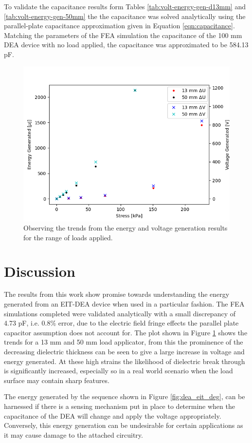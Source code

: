 To validate the capacitance results form Tables \ref{tab:volt-energy-gen-d13mm} and \ref{tab:volt-energy-gen-50mm} the the capacitance was solved analytically using the parallel-plate capacitance approximation given in Equation \ref{eqn:capacitance}. Matching the parameters of the FEA simulation the capacitance of the 100 mm DEA device with no load applied, the capacitance was approximated to be 584.13 pF.

\begin{figure}[H]
	\centering
	\includegraphics[width=0.6\linewidth]{Figures/plot_DEG_stress_vs_VgenUgen.png}
	\caption{Observing the trends from the energy and voltage generation results for the range of loads applied.}
	\label{fig:volt-energy-gen-13_and_50mm}
\end{figure}


\section{Discussion}
\label{sec:discussion}
The results from this work show promise towards understanding the energy generated from an EIT-DEA device when used in a particular fashion. The FEA simulations completed were validated analytically with a small discrepancy of 4.73 pF, i.e. 0.8\% error, due to the electric field fringe effects the parallel plate capacitor assumption does not account for. The plot shown in Figure \ref{fig:volt-energy-gen-13_and_50mm} shows the trends for a 13 mm and 50 mm load applicator, from this the prominence of the decreasing dielectric thickness can be seen to give a large increase in voltage and energy generated. At these high strains the likelihood of dielectric break through is significantly increased, especially so in a real world scenario when the load surface may contain sharp features.

The energy generated by the sequence shown in Figure \ref{fig:dea_eit_deg}, can be harnessed if there is a sensing mechanism put in place to determine when the capacitance of the DEA will change and apply the voltage appropriately. Conversely, this energy generation can be undesirable for certain applications as it may cause damage to the attached circuitry.

